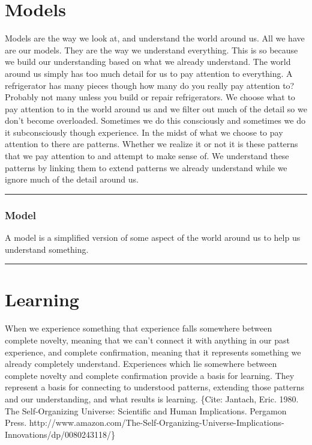 \documentclass[]{memoir}
\begin{document}
\section{Models}

Models are the way we look at, and understand the world around us. All
we have are our models. They are the way we understand everything. This
is so because we build our understanding based on what we already
understand. The world around us simply has too much detail for us to pay
attention to everything. A refrigerator has many pieces though how many
do you really pay attention to? Probably not many unless you build or
repair refrigerators. We choose what to pay attention to in the world
around us and we filter out much of the detail so we don't become
overloaded. Sometimes we do this consciously and sometimes we do it
subconsciously though experience. In the midst of what we choose to pay
attention to there are patterns. Whether we realize it or not it is
these patterns that we pay attention to and attempt to make sense of. We
understand these patterns by linking them to extend patterns we already
understand while we ignore much of the detail around us.

\begin{center}\rule{3in}{0.4pt}\end{center}

\subsubsection{Model}

A model is a simplified version of some aspect of the world around us to
help us understand something.

\begin{center}\rule{3in}{0.4pt}\end{center}

\section{Learning}

When we experience something that experience falls somewhere between
complete novelty, meaning that we can't connect it with anything in our
past experience, and complete confirmation, meaning that it represents
something we already completely understand. Experiences which lie
somewhere between complete novelty and complete confirmation provide a
basis for learning. They represent a basis for connecting to understood
patterns, extending those patterns and our understanding, and what
results is learning. \{Cite: Jantach, Eric. 1980. The Self-Organizing
Universe: Scientific and Human Implications. Pergamon Press.
http://www.amazon.com/The-Self-Organizing-Universe-Implications-Innovations/dp/0080243118/\}
\end{document}
